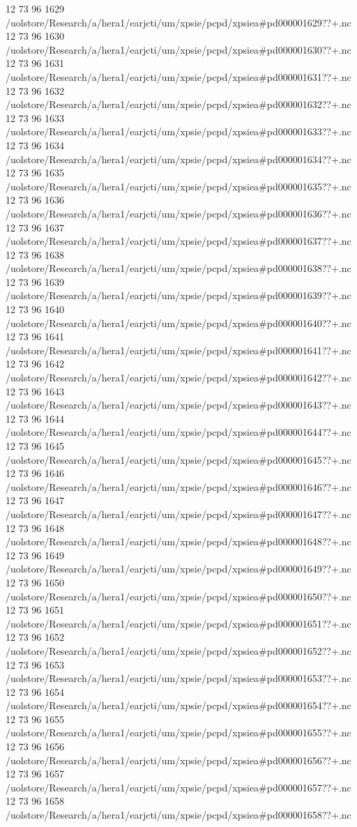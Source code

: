 12 73 96
1629
/uolstore/Research/a/hera1/earjcti/um/xpsie/pcpd/xpsiea#pd000001629??+.nc
12 73 96
1630
/uolstore/Research/a/hera1/earjcti/um/xpsie/pcpd/xpsiea#pd000001630??+.nc
12 73 96
1631
/uolstore/Research/a/hera1/earjcti/um/xpsie/pcpd/xpsiea#pd000001631??+.nc
12 73 96
1632
/uolstore/Research/a/hera1/earjcti/um/xpsie/pcpd/xpsiea#pd000001632??+.nc
12 73 96
1633
/uolstore/Research/a/hera1/earjcti/um/xpsie/pcpd/xpsiea#pd000001633??+.nc
12 73 96
1634
/uolstore/Research/a/hera1/earjcti/um/xpsie/pcpd/xpsiea#pd000001634??+.nc
12 73 96
1635
/uolstore/Research/a/hera1/earjcti/um/xpsie/pcpd/xpsiea#pd000001635??+.nc
12 73 96
1636
/uolstore/Research/a/hera1/earjcti/um/xpsie/pcpd/xpsiea#pd000001636??+.nc
12 73 96
1637
/uolstore/Research/a/hera1/earjcti/um/xpsie/pcpd/xpsiea#pd000001637??+.nc
12 73 96
1638
/uolstore/Research/a/hera1/earjcti/um/xpsie/pcpd/xpsiea#pd000001638??+.nc
12 73 96
1639
/uolstore/Research/a/hera1/earjcti/um/xpsie/pcpd/xpsiea#pd000001639??+.nc
12 73 96
1640
/uolstore/Research/a/hera1/earjcti/um/xpsie/pcpd/xpsiea#pd000001640??+.nc
12 73 96
1641
/uolstore/Research/a/hera1/earjcti/um/xpsie/pcpd/xpsiea#pd000001641??+.nc
12 73 96
1642
/uolstore/Research/a/hera1/earjcti/um/xpsie/pcpd/xpsiea#pd000001642??+.nc
12 73 96
1643
/uolstore/Research/a/hera1/earjcti/um/xpsie/pcpd/xpsiea#pd000001643??+.nc
12 73 96
1644
/uolstore/Research/a/hera1/earjcti/um/xpsie/pcpd/xpsiea#pd000001644??+.nc
12 73 96
1645
/uolstore/Research/a/hera1/earjcti/um/xpsie/pcpd/xpsiea#pd000001645??+.nc
12 73 96
1646
/uolstore/Research/a/hera1/earjcti/um/xpsie/pcpd/xpsiea#pd000001646??+.nc
12 73 96
1647
/uolstore/Research/a/hera1/earjcti/um/xpsie/pcpd/xpsiea#pd000001647??+.nc
12 73 96
1648
/uolstore/Research/a/hera1/earjcti/um/xpsie/pcpd/xpsiea#pd000001648??+.nc
12 73 96
1649
/uolstore/Research/a/hera1/earjcti/um/xpsie/pcpd/xpsiea#pd000001649??+.nc
12 73 96
1650
/uolstore/Research/a/hera1/earjcti/um/xpsie/pcpd/xpsiea#pd000001650??+.nc
12 73 96
1651
/uolstore/Research/a/hera1/earjcti/um/xpsie/pcpd/xpsiea#pd000001651??+.nc
12 73 96
1652
/uolstore/Research/a/hera1/earjcti/um/xpsie/pcpd/xpsiea#pd000001652??+.nc
12 73 96
1653
/uolstore/Research/a/hera1/earjcti/um/xpsie/pcpd/xpsiea#pd000001653??+.nc
12 73 96
1654
/uolstore/Research/a/hera1/earjcti/um/xpsie/pcpd/xpsiea#pd000001654??+.nc
12 73 96
1655
/uolstore/Research/a/hera1/earjcti/um/xpsie/pcpd/xpsiea#pd000001655??+.nc
12 73 96
1656
/uolstore/Research/a/hera1/earjcti/um/xpsie/pcpd/xpsiea#pd000001656??+.nc
12 73 96
1657
/uolstore/Research/a/hera1/earjcti/um/xpsie/pcpd/xpsiea#pd000001657??+.nc
12 73 96
1658
/uolstore/Research/a/hera1/earjcti/um/xpsie/pcpd/xpsiea#pd000001658??+.nc

